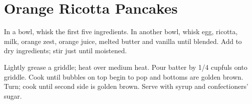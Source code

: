 \section{Orange Ricotta Pancakes}
\begin{recipe}






	In a bowl, whisk the first five ingredients. In another bowl, whisk egg, ricotta, milk, orange zest, orange juice, melted butter and vanilla until blended. Add to dry ingredients; stir just until moistened.

	Lightly grease a griddle; heat over medium heat. Pour batter by 1/4 cupfuls onto griddle. Cook until bubbles on top begin to pop and bottoms are golden brown. Turn; cook until second side is golden brown. Serve with syrup and confectioners' sugar.




\end{recipe}
